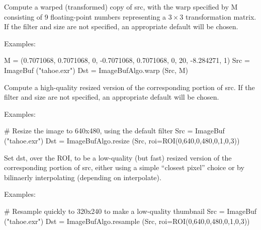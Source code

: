 Compute a warped (transformed) copy of {\cf src},
with the warp specified by {\cf M} consisting of 9 floating-point numbers
representing a $3 \times 3$ transformation matrix.  If the filter and size
are not specified, an appropriate default will be chosen.

\smallskip
\noindent Examples:
\begin{code}
    M = (0.7071068, 0.7071068, 0, -0.7071068, 0.7071068, 0, 20, -8.284271, 1)
    Src = ImageBuf ("tahoe.exr")
    Dst = ImageBufAlgo.warp (Src, M)
\end{code}
\apiend


 
Compute a high-quality resized version of the
corresponding portion of {\cf src}.  If the filter and size are not
specified, an appropriate default will be chosen.

\smallskip
\noindent Examples:
\begin{code}
    # Resize the image to 640x480, using the default filter
    Src = ImageBuf ("tahoe.exr")
    Dst = ImageBufAlgo.resize (Src, roi=ROI(0,640,0,480,0,1,0,3))
\end{code}
\apiend


 
Set {\cf dst}, over the ROI, to be a low-quality (but fast) resized version
of the corresponding portion of {\cf src}, either using a simple ``closest
pixel'' choice or by bilinaerly interpolating (depending on {\cf
interpolate}).

\smallskip
\noindent Examples:
\begin{code}
    # Resample quickly to 320x240 to make a low-quality thumbnail
    Src = ImageBuf ("tahoe.exr")
    Dst = ImageBufAlgo.resample (Src, roi=ROI(0,640,0,480,0,1,0,3))
\end{code}
\apiend


